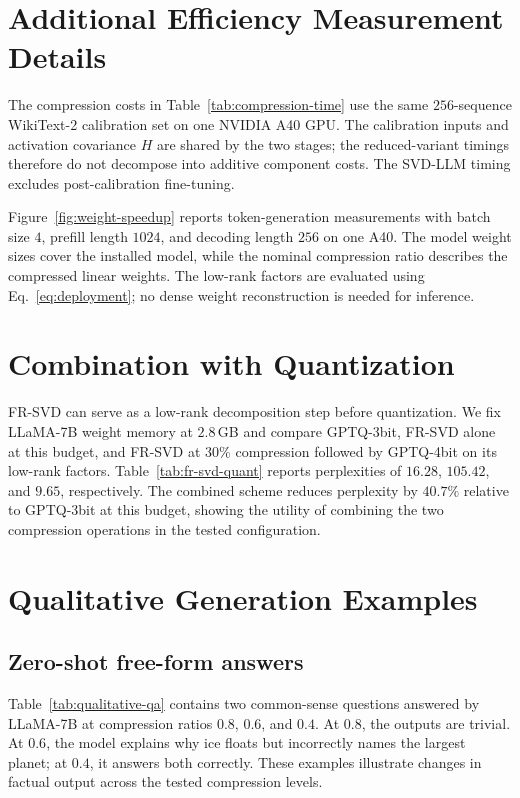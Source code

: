 

\section{Additional Efficiency Measurement Details}\label{app:efficiency}

The compression costs in Table~\ref{tab:compression-time} use the same $256$-sequence WikiText-2 calibration set on one NVIDIA A40 GPU. The calibration inputs and activation covariance $H$ are shared by the two stages; the reduced-variant timings therefore do not decompose into additive component costs. The SVD-LLM timing excludes post-calibration fine-tuning.

Figure~\ref{fig:weight-speedup} reports token-generation measurements with batch size $4$, prefill length $1024$, and decoding length $256$ on one A40. The model weight sizes cover the installed model, while the nominal compression ratio describes the compressed linear weights. The low-rank factors are evaluated using Eq.~\eqref{eq:deployment}; no dense weight reconstruction is needed for inference.

\section{Combination with Quantization}\label{app:quantization}
FR-SVD can serve as a low-rank decomposition step before quantization. We fix LLaMA-7B weight memory at $2.8$\,GB and compare GPTQ-3bit, FR-SVD alone at this budget, and FR-SVD at $30\%$ compression followed by GPTQ-4bit on its low-rank factors. Table~\ref{tab:fr-svd-quant} reports perplexities of $16.28$, $105.42$, and $9.65$, respectively. The combined scheme reduces perplexity by $40.7\%$ relative to GPTQ-3bit at this budget, showing the utility of combining the two compression operations in the tested configuration.



\section{Qualitative Generation Examples}\label{app:qualitative}

\subsection{Zero-shot free-form answers}
Table~\ref{tab:qualitative-qa} contains two common-sense questions answered by LLaMA-7B at compression ratios $0.8$, $0.6$, and $0.4$. At $0.8$, the outputs are trivial. At $0.6$, the model explains why ice floats but incorrectly names the largest planet; at $0.4$, it answers both correctly. These examples illustrate changes in factual output across the tested compression levels.

